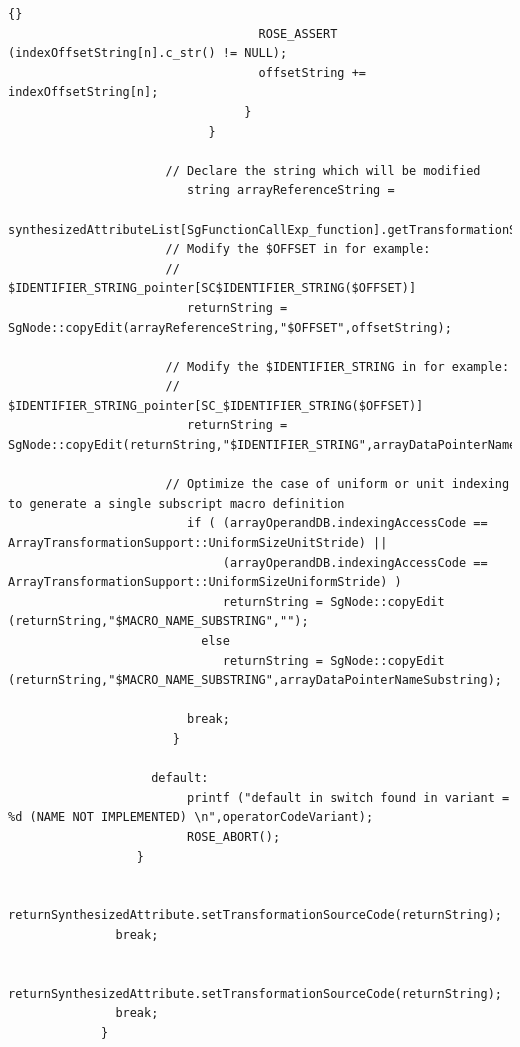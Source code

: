 \documentclass[10pt]{article}
\begin{document}
{\begin{lstlisting}{}
                                   ROSE_ASSERT (indexOffsetString[n].c_str() != NULL);
                                   offsetString += indexOffsetString[n];
                                 }
                            }

                      // Declare the string which will be modified
                         string arrayReferenceString =
                              synthesizedAttributeList[SgFunctionCallExp_function].getTransformationSourceCode();
                      // Modify the $OFFSET in for example:
                      // $IDENTIFIER_STRING_pointer[SC$IDENTIFIER_STRING($OFFSET)]
                         returnString = SgNode::copyEdit(arrayReferenceString,"$OFFSET",offsetString);

                      // Modify the $IDENTIFIER_STRING in for example:
                      // $IDENTIFIER_STRING_pointer[SC_$IDENTIFIER_STRING($OFFSET)]
                         returnString = SgNode::copyEdit(returnString,"$IDENTIFIER_STRING",arrayDataPointerNameSubstring);

                      // Optimize the case of uniform or unit indexing to generate a single subscript macro definition
                         if ( (arrayOperandDB.indexingAccessCode == ArrayTransformationSupport::UniformSizeUnitStride) ||
                              (arrayOperandDB.indexingAccessCode == ArrayTransformationSupport::UniformSizeUniformStride) )
                              returnString = SgNode::copyEdit (returnString,"$MACRO_NAME_SUBSTRING","");
                           else
                              returnString = SgNode::copyEdit (returnString,"$MACRO_NAME_SUBSTRING",arrayDataPointerNameSubstring);

                         break;
                       }

                    default:
                         printf ("default in switch found in variant = %d (NAME NOT IMPLEMENTED) \n",operatorCodeVariant);
                         ROSE_ABORT();
                  }

               returnSynthesizedAttribute.setTransformationSourceCode(returnString);
               break;

               returnSynthesizedAttribute.setTransformationSourceCode(returnString);
               break;
             }


\end{lstlisting}}
\end{document}
